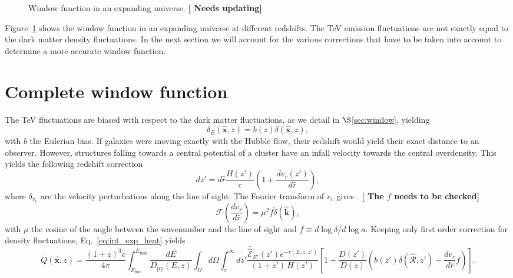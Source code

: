 \documentclass[numberedappendix]{emulateapj}
\newcommand\ALc[1]{{\color{red} \bf #1}} %
\begin{document}
{\begin{figure}[h]
\caption{Window function in an expanding universe.\ALc{[{ Needs updating}]}}
\label{fig:window_nobiases}
\end{figure}
Figure~\ref{fig:window_nobiases} shows the window function in an expanding universe at different redshifts. %
The TeV emission fluctuations are not exactly equal to the dark matter density fluctuations. In the next section we will account for the various corrections that have to be taken into account to determine a more accurate window function.


\section{Complete window function}
\label{sec:window_complete}
The TeV fluctuations are biased with respect to the dark matter fluctuations, as we detail in $\S$\ref{sec:window}, yielding
\begin{equation}
\delta_E(\mathbf{\hat{x}},z)=b(z)\delta(\mathbf{\hat{x}},z),
\label{eq:bias}
\end{equation}
with $b$ the Eulerian bias. If galaxies were moving exactly with the Hubble flow, their redshift would yield their exact distance to an observer. However, structures falling towards a central potential of a cluster have an infall velocity towards the central overdensity. This yields the following redshift correction
\begin{equation}
\label{eq:vel_perturb}
dz'=d\hat r\frac{H(z')}{c}\left(1+\frac{dv_r(z')}{d\hat r}\right),
\end{equation}
where $\delta_{v_r}$ are the velocity perturbations along the line of sight. The Fourier transform of $v_r$ gives \citep{1987MNRAS.227....1K}.\ALc{[{ The $f$ needs to be checked}]}
\begin{equation}
\label{eq:kaiser2}
\mathcal{F}\left(\frac{dv_r}{d\hat r}\right)=\mu^2 f \tilde{\delta}(\mathbf{\hat k}),
\end{equation}
with $\mu$ the cosine of the angle between the wavenumber and the line of sight and $f\equiv d\log\delta/d\log a$. Keeping only first order correction for density fluctuations, Eq.~\eqref{eq:int_exp_heat} yields
\begin{equation}
\label{eq:mean_heat0}
\dot{Q}(\mathbf{\hat{x}},z)=\frac{(1+z)^3c}{4\pi }\int_{E_{\mathrm{min}}}^{E_{\mathrm{max}}}\frac{dE}{D_{\mathrm{pp}}(E,z)}\int_{\Omega}d\Omega\int_z^{\infty} dz'\frac{\mathcal{\bar{\hat E}}_{E'}(z')e^{-\tau(E,z,z')}}{(1+z')\,H(z')}\left[1+\frac{D(z')}{D(z)}\left(b(z')\delta(\mathbf{\hat{\mathcal{R}}}, z') -\frac{dv_r}{d\hat r}f\right)\right].

\end{equation}}
\end{document}
